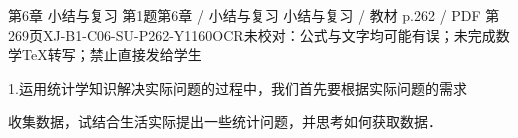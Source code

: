 \begin{bankitem}{第6章 小结与复习 第1题}{第6章 / 小结与复习 小结与复习 / 教材 p.262 / PDF 第269页}{XJ-B1-C06-SU-P262-Y1160}{OCR未校对：公式与文字均可能有误；未完成数学TeX转写；禁止直接发给学生}
\begin{ocrdraft}
\par
1.运用统计学知识解决实际问题的过程中，我们首先要根据实际问题的需求
\par
收集数据，试结合生活实际提出一些统计问题，并思考如何获取数据．
\end{ocrdraft}
\end{bankitem}
